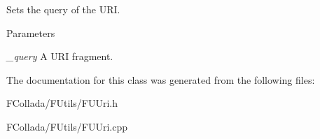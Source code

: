 \label{classFUUri_a41ee1669e5dfb1d8e3653435fd4fef7e}
Sets the query of the URI. 
\begin{DoxyParams}{Parameters}
\item[{\em \_\-query}]A URI fragment. \end{DoxyParams}


The documentation for this class was generated from the following files:\begin{DoxyCompactItemize}
\item 
FCollada/FUtils/FUUri.h\item 
FCollada/FUtils/FUUri.cpp\end{DoxyCompactItemize}
